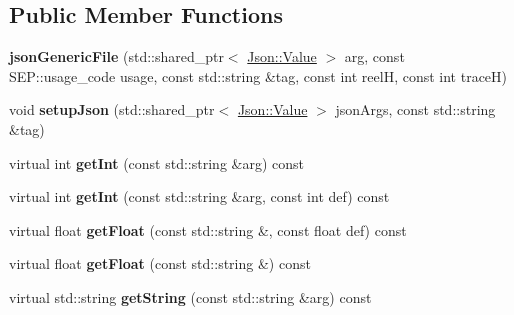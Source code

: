 \subsection*{Public Member Functions}
\begin{DoxyCompactItemize}
\item 
\mbox{\label{class_s_e_p_1_1json_generic_file_a3c2af255a2aaf432c1d7d519be1c5270}} 
{\bfseries json\+Generic\+File} (std\+::shared\+\_\+ptr$<$ \hyperlink{class_json_1_1_value}{Json\+::\+Value} $>$ arg, const S\+E\+P\+::usage\+\_\+code usage, const std\+::string \&tag, const int reelH, const int traceH)
\item 
\mbox{\label{class_s_e_p_1_1json_generic_file_a637995403b50ca11c33ff19fae42fe9a}} 
void {\bfseries setup\+Json} (std\+::shared\+\_\+ptr$<$ \hyperlink{class_json_1_1_value}{Json\+::\+Value} $>$ json\+Args, const std\+::string \&tag)
\item 
\mbox{\label{class_s_e_p_1_1json_generic_file_a2ebc06ca9a73212e3b5aff20d1d0b466}} 
virtual int {\bfseries get\+Int} (const std\+::string \&arg) const
\item 
\mbox{\label{class_s_e_p_1_1json_generic_file_af949f3e88a308a0a6e63c14e012c1d34}} 
virtual int {\bfseries get\+Int} (const std\+::string \&arg, const int def) const
\item 
\mbox{\label{class_s_e_p_1_1json_generic_file_a20c15572bcc4551e7a830b6490593c54}} 
virtual float {\bfseries get\+Float} (const std\+::string \&, const float def) const
\item 
\mbox{\label{class_s_e_p_1_1json_generic_file_abe309afa63f401efdea3b1e2e47ba890}} 
virtual float {\bfseries get\+Float} (const std\+::string \&) const
\item 
\mbox{\label{class_s_e_p_1_1json_generic_file_a50a28dec25d7bc3c46a6b7f9779f17de}} 
virtual std\+::string {\bfseries get\+String} (const std\+::string \&arg) const
\item 
\mbox{\label{class_s_e_p_1_1json_generic_file_a47e77093f98451b47c86e1fb50650baf}} 

\end{DoxyCompactItemize}
